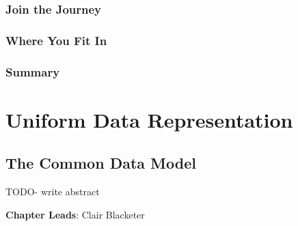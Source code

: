 \documentclass[
  letterpaper,
  paper=7in:10in,
  pagesize=pdftex,
  headinclude=on,
  footinclude=on,
  12pt]{scrbook}
\begin{document}
\section{Join the Journey}\label{sec-ohdsi-begin-join}

\section{Where You Fit In}\label{sec-ohdsi-begin-fit}

\section{Summary}\label{sec-ohdsi-begin-summary}

\part{Uniform Data Representation}

\chapter{The Common Data Model}\label{sec-representation-cdm}

TODO- write abstract

\hfill\break

\textbf{Chapter Leads}: Clair Blacketer
\end{document}
